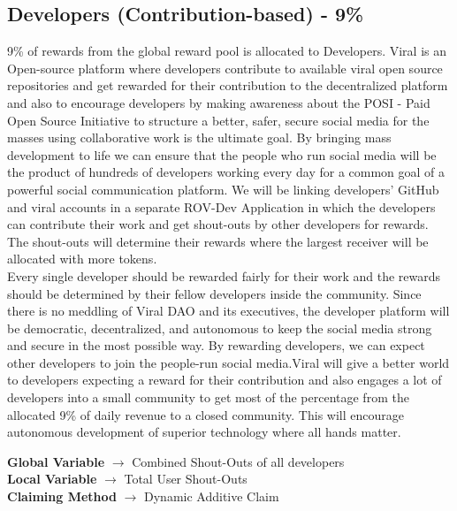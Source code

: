 \documentclass[conference]{IEEEtran}
\begin{document}
\subsection{\textbf{Developers (Contribution-based) - 9\%}}

9\% of rewards from the global reward pool is allocated to Developers. Viral is an Open-source platform where developers contribute to available viral open source repositories and get rewarded for their contribution to the decentralized platform and also to encourage developers by making awareness about the POSI - Paid Open Source Initiative to structure a better, safer, secure social media for the masses using collaborative work is the ultimate goal. By bringing mass development to life we can ensure that the people who run social media will be the product of hundreds of developers working every day for a common goal of a powerful social communication platform. We will be linking developers' GitHub and viral accounts in a separate ROV-Dev Application in which the developers can contribute their work and get shout-outs by other developers for rewards. The shout-outs will determine their rewards where the largest receiver will be allocated with more tokens.\\ 

Every single developer should be rewarded fairly for their work and the rewards should be determined by their fellow developers inside the community. Since there is no meddling of Viral DAO and its executives, the developer platform will be democratic, decentralized, and autonomous to keep the social media strong and secure in the most possible way. By rewarding developers, we can expect other developers to join the people-run social media.Viral will give a better world to developers expecting a reward for their contribution and also engages a lot of developers into a small community to get most of the percentage from the allocated 9\% of daily revenue to a closed community. This will encourage autonomous development of superior technology where all hands matter. \\


\begin{center}
\textbf{Global Variable} $\to$ Combined Shout-Outs of all developers\\
\vspace{2mm}
\textbf{Local Variable} $\to$ Total User Shout-Outs\\
\vspace{2mm}
\textbf{Claiming Method} $\to$ Dynamic Additive Claim\\
\end{center}
\end{document}
